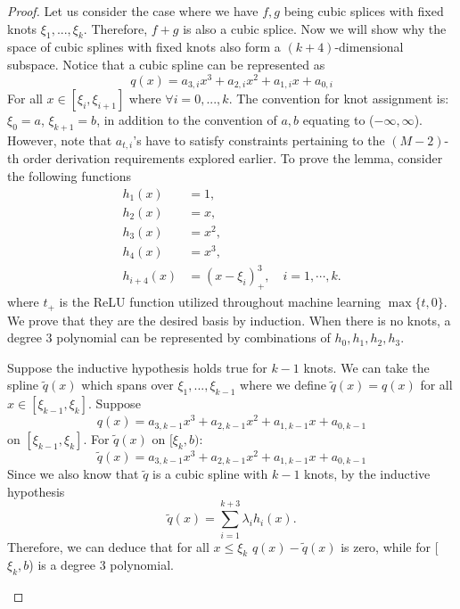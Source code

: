 \begin{proof}
	Let us consider the case where we have $f,g$ being cubic splices with fixed knots $\xi_1,...,\xi_k$. Therefore, $f+g$ is also a cubic splice. Now we will show why the space of cubic splines with fixed knots also form a $(k+4)$-dimensional subspace. Notice that a cubic spline can be represented as \[
	q(x) = a_{3,i}x^3 + a_{2,i}x^2 + a_{1,i}x + a_{0,i}
	\]
	For all $x \in [\xi_i, \xi_{i+1}]$ where $\forall i = 0, ..., k$. The convention for knot assignment is: $\xi_0 = a$, $\xi_{k+1} = b$, in addition to the convention of $a,b$ equating to ($-\infty,\infty$). However, note that $a_{t,i}$'s have to satisfy constraints pertaining to the $(M-2)$-th order derivation requirements explored earlier. To prove the lemma, consider the following functions
	\begin{align*}
	h_1(x) & = 1, \\
	h_2(x) & = x, \\
	h_3(x) & = x^2, \\
	h_4(x) &= x^3, \\
	h_{i+4}(x) &= (x-\xi_i)_+^3, \quad i =1, \cdots, k.
	\end{align*}
	where $t_+$ is the ReLU function utilized throughout machine learning $\max\{t,0\}$. We prove that they are the desired basis by induction.  When there is no knots, a degree 3 polynomial can be represented by combinations of $h_0, h_1, h_2, h_3$. 
	
	Suppose the inductive hypothesis holds true for $k-1$ knots. We can take the spline $\widetilde{q}(x)$ which spans over $\xi_1,...,\xi_{k-1}$ where we define $\widetilde{q}(x) = q(x)$ for all $x \in [\xi_{k-1},\xi_k]$. Suppose \[
	q(x) =  a_{3,k-1}x^3 + a_{2,k-1}x^2 + a_{1,k-1}x + a_{0,k-1}
	\]
	on $[\xi_{k-1}, \xi_k]$. For $\widetilde{q}(x)$ on $[\xi_k,b)$: \[
	\widetilde{q}(x) =  a_{3,k-1}x^3 + a_{2,k-1}x^2 + a_{1,k-1}x + a_{0,k-1}
	\] Since we also know that $\widetilde{q}$ is a cubic spline with $k-1$ knots, by the inductive hypothesis \[
	\widetilde{q}(x) = \sum_{i=1}^{k+3}\lambda_ih_i(x).
	\]
	Therefore, we can deduce that for all $x \leq \xi_k$ $q(x) - \widetilde{q}(x)$ is zero, while for [$\xi_k,b$) is a degree 3 polynomial. 
	\begin{figure}[!hb]
		\begin{center}
\end{center}
\end{figure}
\end{proof}
